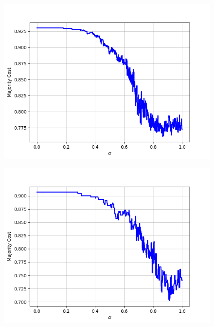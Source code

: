 \begin{figure}[H]
\begin{minipage}{.24\textwidth}
  {\includegraphics[width=\linewidth]{plots/omniglot-intra-sc/Greek}}
\end{minipage}
\begin{minipage}{.24\textwidth}
  \centering
  {\includegraphics[width=\linewidth]{plots/omniglot-intra-sc/Gujarati}}
\end{minipage}
\begin{minipage}{.24\textwidth}
  \centering

\end{minipage}
\end{figure}
